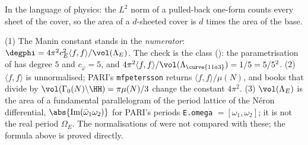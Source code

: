 In the language of physics: the $L^2$ norm of a pulled-back one-form counts every sheet of the cover, so the area of a $d$-sheeted cover is $d$ times the area of the base.

\begin{warning}\label{warn:moddeg:zw-normalisation}
(1) The Manin constant stands in the \emph{numerator}: $\degphi=4\pi^2c_E^2\langle f,f\rangle/\vol(\Lambda_E)$. The check is the class  (): the parametrisation of
 has degree $5$ and $c_\varphi=5$, and $4\pi^2\langle f,f\rangle/\vol(\Lambda_{\curve{11a3}})=1/5=5/5^2$. (2) $\langle f,f\rangle$ is unnormalised; PARI's \texttt{mfpetersson} returns
$\langle f,f\rangle/\mu(N)$, and books that divide by $\vol(\Gamma_0(N)\backslash\HH)=\pi\mu(N)/3$ change the constant $4\pi^2$. (3) $\vol(\Lambda_E)$ is the area of a fundamental
parallelogram of the period lattice of the N\'eron differential, $\abs{\operatorname{Im}(\bar\omega_1\omega_2)}$ for PARI's periods \texttt{E.omega} $=[\omega_1,\omega_2]$; it is not the real
period $\Omega_E$. The normalisations of \cite{Zagier85,Watkins02} were not compared with these; the formula above is proved directly.
\end{warning}

